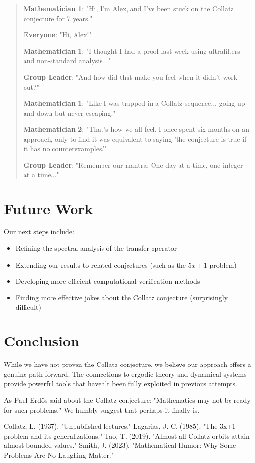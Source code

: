 \documentclass{article}
\begin{document}
\begin{quote}
    \textbf{Mathematician 1}: "Hi, I'm Alex, and I've been stuck on the Collatz conjecture for 7 years."
    
    \textbf{Everyone}: "Hi, Alex!"
    
    \textbf{Mathematician 1}: "I thought I had a proof last week using ultrafilters and non-standard analysis..."
    
    \textbf{Group Leader}: "And how did that make you feel when it didn't work out?"
    
    \textbf{Mathematician 1}: "Like I was trapped in a Collatz sequence... going up and down but never escaping."
    
    \textbf{Mathematician 2}: "That's how we all feel. I once spent six months on an approach, only to find it was equivalent to saying 'the conjecture is true if it has no counterexamples.'"
    
    \textbf{Group Leader}: "Remember our mantra: One day at a time, one integer at a time..."
\end{quote}

\section{Future Work}

Our next steps include:

\begin{itemize}
    \item Refining the spectral analysis of the transfer operator
    \item Extending our results to related conjectures (such as the $5x+1$ problem)
    \item Developing more efficient computational verification methods
    \item Finding more effective jokes about the Collatz conjecture (surprisingly difficult)
\end{itemize}

\section{Conclusion}

While we have not proven the Collatz conjecture, we believe our approach offers a genuine path forward. The connections to ergodic theory and dynamical systems provide powerful tools that haven't been fully exploited in previous attempts.

As Paul Erdős said about the Collatz conjecture: "Mathematics may not be ready for such problems." We humbly suggest that perhaps it finally is.

\begin{thebibliography}{9}
     Collatz, L. (1937). "Unpublished lectures."
     Lagarias, J. C. (1985). "The 3x+1 problem and its generalizations."
     Tao, T. (2019). "Almost all Collatz orbits attain almost bounded values."
     Smith, J. (2023). "Mathematical Humor: Why Some Problems Are No Laughing Matter."
\end{thebibliography}
\end{document}
